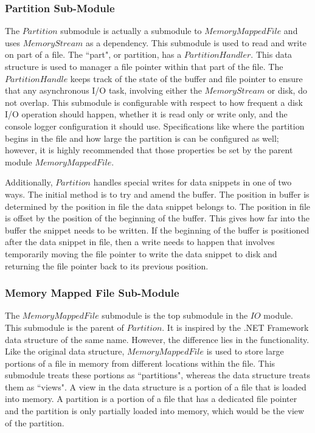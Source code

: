 \subsubsection{Partition Sub-Module}

The $Partition$ submodule is actually a submodule to $MemoryMappedFile$ and uses $MemoryStream$ as a dependency. This submodule is used to read and write on part of a file. The ``part", or partition, has a $PartitionHandler$. This data structure is used to manager a file pointer within that part of the file. The $PartitionHandle$ keeps track of the state of the buffer and file pointer to ensure that any asynchronous I/O task, involving either the $MemoryStream$ or disk, do not overlap. This submodule is configurable with respect to how frequent a disk I/O operation should happen, whether it is read only or write only, and the console logger configuration it should use. Specifications like where the partition begins in the file and how large the partition is can be configured as well; however, it is highly recommended that those properties be set by the parent module $MemoryMappedFile$.

Additionally, $Partition$ handles special writes for data snippets in one of two ways. The initial method is to try and amend the buffer. The position in buffer is determined by the position in file the data snippet belongs to. The position in file is offset by the position of the beginning of the buffer. This gives how far into the buffer the snippet needs to be written. If the beginning of the buffer is positioned after the data snippet in file, then a write needs to happen that involves temporarily moving the file pointer to write the data snippet to disk and returning the file pointer back to its previous position.

\subsubsection{Memory Mapped File Sub-Module}

The $MemoryMappedFile$ submodule is the top submodule in the $IO$ module. This submodule is the parent of $Partition$. It is inspired by the .NET Framework data structure of the same name. However, the difference lies in the functionality. Like the original data structure, $MemoryMappedFile$ is used to store large portions of a file in memory from different locations within the file. This submodule treats these portions as ``partitions", whereas the data structure treats them as ``views". A view in the data structure is a portion of a file that is loaded into memory. A partition is a portion of a file that has a dedicated file pointer and the partition is only partially loaded into memory, which would be the view of the partition.

